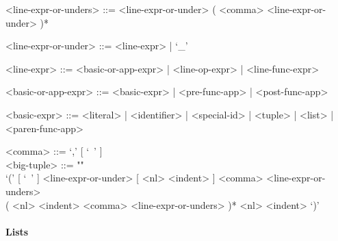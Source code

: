 \documentclass{article}
\begin{document}
\begin{itemize}
\begin{grammar}
<line-expr-or-unders> ::=
<line-expr-or-under> ( <comma> <line-expr-or-under> )*

<line-expr-or-under> ::= <line-expr> | `_'

<line-expr> ::= <basic-or-app-expr> | <line-op-expr> | <line-func-expr>

<basic-or-app-expr> ::= <basic-expr> | <pre-func-app> | <post-func-app>

<basic-expr> ::=
<literal> | <identifier> | <special-id> | <tuple> | <list> | <paren-func-app>

<comma> ::= `,' [ `\ ' ]
\\

<big-tuple> ::= ""\\
`(' [ `\ ' ] <line-expr-or-under> [ <nl> <indent> ]
<comma> <line-expr-or-unders> \\
( <nl> <indent> <comma> <line-expr-or-unders> )* 
<nl> <indent> `)'
\end{grammar}

\end{itemize}

\paragraph{Lists}
\end{document}
